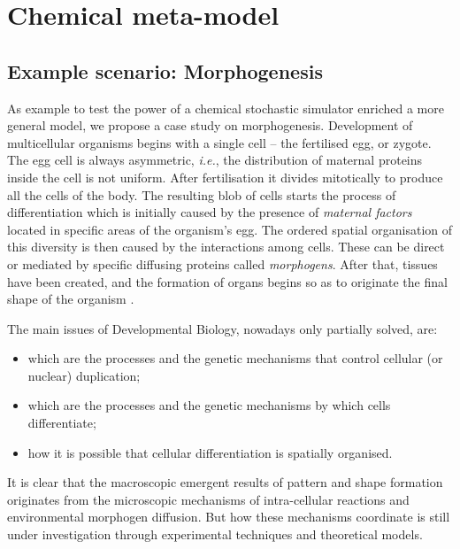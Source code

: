 \documentclass[12pt,a4paper,twoside,openright]{book}
\begin{document}
\section{Chemical meta-model}


\subsection{Example scenario: Morphogenesis}

As example to test the power of a chemical stochastic simulator enriched a more general model, we propose a case study on morphogenesis.
%
Development of multicellular organisms begins with a single cell -- the fertilised egg, or zygote.
%
The egg cell is always asymmetric, \emph{i.e.}, the distribution of maternal proteins inside the cell is not uniform.
%
After fertilisation it divides mitotically to produce all the cells of the body. 
%
The resulting blob of cells starts the process of differentiation which is initially caused by the presence of \emph{maternal factors} located in specific areas of the organism's egg.
%
The ordered spatial organisation of this diversity is then caused by the interactions among cells. These can be direct or mediated by specific diffusing proteins called \emph{morphogens}. 
%
After that, tissues have been created, and the formation of organs begins so as to originate the final shape of the organism \cite{alberts, gilbert2006-devbio}. 

The main issues of Developmental Biology, nowadays only partially solved, are:
\begin{itemize}
 \item which are the processes and the genetic mechanisms that control cellular (or nuclear) duplication;
 \item which are the processes and the genetic mechanisms by which cells differentiate;
 \item how it is possible that cellular differentiation is spatially organised.
\end{itemize}

It is clear that the macroscopic emergent results of pattern and shape formation originates from the microscopic mechanisms of intra-cellular reactions and environmental morphogen diffusion.
%
But how these mechanisms coordinate is still under investigation through experimental techniques and theoretical models.
\end{document}

